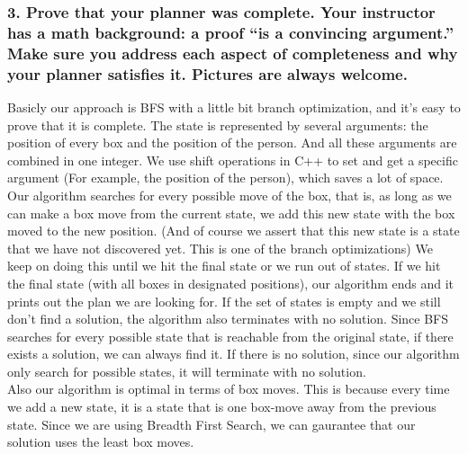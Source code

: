 \documentclass[10pt, letter]{article}
\begin{document}
\subsubsection*{3. Prove that your planner was complete. Your instructor has a math background: a proof ``is
a convincing argument.'' Make sure you address each aspect of completeness and why your
planner satisfies it. Pictures are always welcome.}
Basicly our approach is BFS with a little bit branch optimization, and it's easy to prove that it is complete.
The state is represented by several arguments: the position of every box and the position of the person.
And all these arguments are combined in one integer.
We use shift operations in C++ to set and get a specific argument (For example, the position of the person), which saves a lot of space.
Our algorithm searches for every possible move of the box, that is, as long as we can make a box move from the current state, we add this new state with the box moved to the new position. 
(And of course we assert that this new state is a state that we have not discovered yet. This is one of the branch optimizations)
We keep on doing this until we hit the final state or we run out of states.
If we hit the final state (with all boxes in designated positions), our algorithm ends and it prints out the plan we are looking for.
If the set of states is empty and we still don't find a solution, the algorithm also terminates with no solution.
Since BFS searches for every possible state that is reachable from the original state, if there exists a solution, we can always find it.
If there is no solution, since our algorithm only search for possible states, it will terminate with no solution.
\\Also our algorithm is optimal in terms of box moves. This is because every time we add a new state, it is a state that is one box-move away from the previous state.
Since we are using Breadth First Search, we can gaurantee that our solution uses the least box moves.
\end{document}
